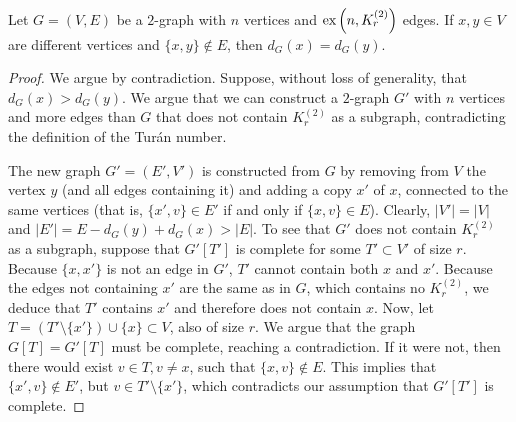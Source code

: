 \begin{lemma}\label{lem:same_degree}
    Let $G = (V, E)$ be a $2$-graph with $n$ vertices and
    $\text{ex} \left( n, K^{(2)}_{r} \right)$ edges.
    If $x, y \in V$ are different vertices and $\{x, y\} \notin E$, then $d_G(x) = d_G(y)$.
    \begin{proof}
        We argue by contradiction.
        Suppose, without loss of generality, that $d_G(x) > d_G(y)$.
        We argue that we can construct a $2$-graph $G'$ with $n$ vertices
        and more edges than $G$ that does not contain $K_r^{(2)}$ as a subgraph,
        contradicting the definition of
        the Turán number.

        The new graph $G' = (E', V')$ is constructed from $G$ by removing from $V$ the vertex $y$
        (and all edges containing it)
        and adding a copy $x'$ of $x$, connected to the same vertices (that is, $\{x', v\} \in E'$
        if and only if $\{x, v\} \in E$).
        Clearly, $|V'| = |V|$ and $|E'| = E - d_G(y) + d_G(x) > |E|$.
        To see that $G'$ does not contain $K_r^{(2)}$ as a subgraph,
        suppose that $G'[T']$ is complete for some $T' \subset V'$ of size $r$.
        Because $\{x, x'\}$ is not an edge in $G'$, $T'$ cannot contain both $x$ and $x'$.
        Because the edges not containing $x'$ are the same as in $G$, which contains no $K_r^{(2)}$,
        we deduce that $T'$ contains $x'$ and therefore does not contain $x$.
        Now, let $T = (T' \setminus \{x'\}) \cup \{x\} \subset V$, also of size $r$.
        We argue that the graph $G[T] = G'[T]$ must be complete, reaching a contradiction.
        If it were not, then there would exist $v \in T, v \neq x$, such that $\{x, v\} \notin E$.
        This implies that $\{x', v\} \notin E'$, but $v \in T' \setminus \{x'\}$,
        which contradicts our assumption that $G'[T']$ is complete.
    \end{proof}
\end{lemma}

